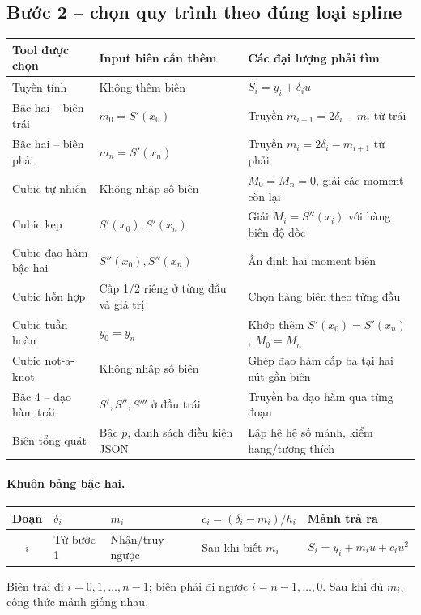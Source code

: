 \subsection{Bước 2 -- chọn quy trình theo đúng loại spline}
\begin{center}\small\begin{tabular}{@{}p{.28\linewidth}p{.30\linewidth}p{.33\linewidth}@{}}\toprule
Tool được chọn&Input biên cần thêm&Các đại lượng phải tìm\\\midrule
Tuyến tính&Không thêm biên&$S_i=y_i+\delta_i u$\\
Bậc hai -- biên trái&$m_0=S'(x_0)$&Truyền $m_{i+1}=2\delta_i-m_i$ từ trái\\
Bậc hai -- biên phải&$m_n=S'(x_n)$&Truyền $m_i=2\delta_i-m_{i+1}$ từ phải\\
Cubic tự nhiên&Không nhập số biên&$M_0=M_n=0$, giải các moment còn lại\\
Cubic kẹp&$S'(x_0),S'(x_n)$&Giải $M_i=S''(x_i)$ với hàng biên độ dốc\\
Cubic đạo hàm bậc hai&$S''(x_0),S''(x_n)$&Ấn định hai moment biên\\
Cubic hỗn hợp&Cấp 1/2 riêng ở từng đầu và giá trị&Chọn hàng biên theo từng đầu\\
Cubic tuần hoàn&$y_0=y_n$&Khớp thêm $S'(x_0)=S'(x_n)$, $M_0=M_n$\\
Cubic not-a-knot&Không nhập số biên&Ghép đạo hàm cấp ba tại hai nút gần biên\\
Bậc 4 -- đạo hàm trái&$S',S'',S'''$ ở đầu trái&Truyền ba đạo hàm qua từng đoạn\\
Biên tổng quát&Bậc $p$, danh sách điều kiện JSON&Lập hệ hệ số mảnh, kiểm hạng/tương thích\\\bottomrule
\end{tabular}\end{center}

\paragraph{Khuôn bảng bậc hai.}
\begin{center}\small\begin{tabular}{cllll}\toprule
Đoạn&$\delta_i$&$m_i$&$c_i=(\delta_i-m_i)/h_i$&Mảnh trả ra\\\midrule
$i$&Từ bước 1&Nhận/truy ngược&Sau khi biết $m_i$&$S_i=y_i+m_iu+c_iu^2$\\\bottomrule
\end{tabular}\end{center}
Biên trái đi $i=0,1,\ldots,n-1$; biên phải đi ngược $i=n-1,\ldots,0$. Sau khi đủ $m_i$, công thức mảnh giống nhau.

